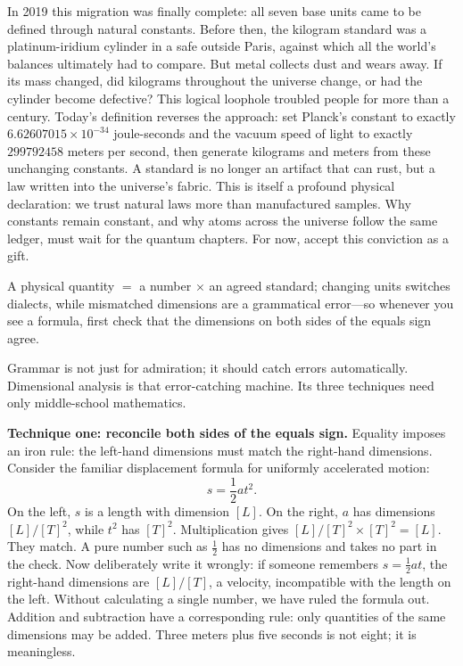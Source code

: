 In 2019 this migration was finally complete: all seven base units came to be defined through natural constants. Before then, the kilogram standard was a platinum-iridium cylinder in a safe outside Paris, against which all the world's balances ultimately had to compare. But metal collects dust and wears away. If its mass changed, did kilograms throughout the universe change, or had the cylinder become defective? This logical loophole troubled people for more than a century. Today's definition reverses the approach: set Planck's constant to exactly $6.62607015\times10^{-34}$ joule-seconds and the vacuum speed of light to exactly $299792458$ meters per second, then generate kilograms and meters from these unchanging constants. A standard is no longer an artifact that can rust, but a law written into the universe's fabric. This is itself a profound physical declaration: we trust natural laws more than manufactured samples. Why constants remain constant, and why atoms across the universe follow the same ledger, must wait for the quantum chapters. For now, accept this conviction as a gift.


\begin{oneline}
A physical quantity $=$ a number $\times$ an agreed standard; changing units switches dialects, while mismatched dimensions are a grammatical error---so whenever you see a formula, first check that the dimensions on both sides of the equals sign agree.
\end{oneline}


Grammar is not just for admiration; it should catch errors automatically. Dimensional analysis is that error-catching machine. Its three techniques need only middle-school mathematics.

\textbf{Technique one: reconcile both sides of the equals sign.} Equality imposes an iron rule: the left-hand dimensions must match the right-hand dimensions. Consider the familiar displacement formula for uniformly accelerated motion:
\[
s = \frac{1}{2} a t^2 .
\]
On the left, $s$ is a length with dimension $[L]$. On the right, $a$ has dimensions $[L]/[T]^2$, while $t^2$ has $[T]^2$. Multiplication gives $[L]/[T]^2 \times [T]^2 = [L]$. They match. A pure number such as $\frac{1}{2}$ has no dimensions and takes no part in the check. Now deliberately write it wrongly: if someone remembers $s = \frac{1}{2} a t$, the right-hand dimensions are $[L]/[T]$, a velocity, incompatible with the length on the left. Without calculating a single number, we have ruled the formula out. Addition and subtraction have a corresponding rule: only quantities of the same dimensions may be added. Three meters plus five seconds is not eight; it is meaningless.

